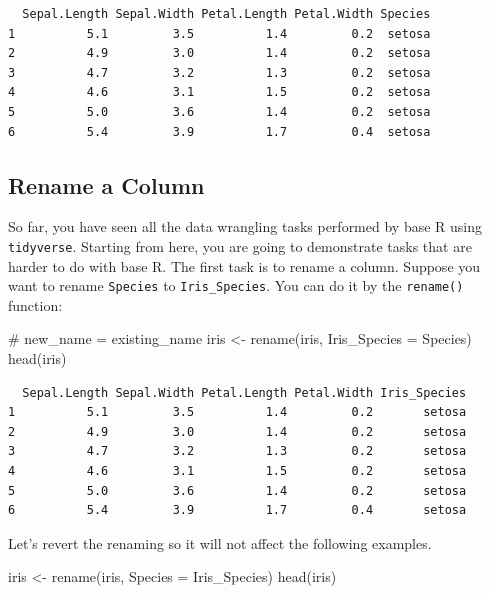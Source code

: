 \documentclass[
  letterpaper,
]{book}
\newenvironment{Shaded}{\begin{snugshade}}{\end{snugshade}}
\newcommand{\AttributeTok}[1]{\textcolor[rgb]{0.40,0.45,0.13}{#1}}
\newcommand{\CommentTok}[1]{\textcolor[rgb]{0.37,0.37,0.37}{#1}}
\newcommand{\FunctionTok}[1]{\textcolor[rgb]{0.28,0.35,0.67}{#1}}
\newcommand{\NormalTok}[1]{\textcolor[rgb]{0.00,0.23,0.31}{#1}}
\newcommand{\OtherTok}[1]{\textcolor[rgb]{0.00,0.23,0.31}{#1}}
\begin{document}
\begin{verbatim}
  Sepal.Length Sepal.Width Petal.Length Petal.Width Species
1          5.1         3.5          1.4         0.2  setosa
2          4.9         3.0          1.4         0.2  setosa
3          4.7         3.2          1.3         0.2  setosa
4          4.6         3.1          1.5         0.2  setosa
5          5.0         3.6          1.4         0.2  setosa
6          5.4         3.9          1.7         0.4  setosa
\end{verbatim}

\subsection{Rename a Column}\label{rename-a-column}

So far, you have seen all the data wrangling tasks performed by base R
using \texttt{tidyverse}. Starting from here, you are going to
demonstrate tasks that are harder to do with base R. The first task is
to rename a column. Suppose you want to rename \texttt{Species} to
\texttt{Iris\_Species}. You can do it by the \texttt{rename()} function:

\begin{Shaded}
\begin{Highlighting}[]
\CommentTok{\# new\_name = existing\_name}
\NormalTok{iris }\OtherTok{\textless{}{-}} \FunctionTok{rename}\NormalTok{(iris, }\AttributeTok{Iris\_Species =}\NormalTok{ Species)}
\FunctionTok{head}\NormalTok{(iris)}
\end{Highlighting}
\end{Shaded}

\begin{verbatim}
  Sepal.Length Sepal.Width Petal.Length Petal.Width Iris_Species
1          5.1         3.5          1.4         0.2       setosa
2          4.9         3.0          1.4         0.2       setosa
3          4.7         3.2          1.3         0.2       setosa
4          4.6         3.1          1.5         0.2       setosa
5          5.0         3.6          1.4         0.2       setosa
6          5.4         3.9          1.7         0.4       setosa
\end{verbatim}

Let's revert the renaming so it will not affect the following examples.

\begin{Shaded}
\begin{Highlighting}[]
\NormalTok{iris }\OtherTok{\textless{}{-}} \FunctionTok{rename}\NormalTok{(iris, }\AttributeTok{Species =}\NormalTok{ Iris\_Species)}
\FunctionTok{head}\NormalTok{(iris)}
\end{Highlighting}
\end{Shaded}
\end{document}
